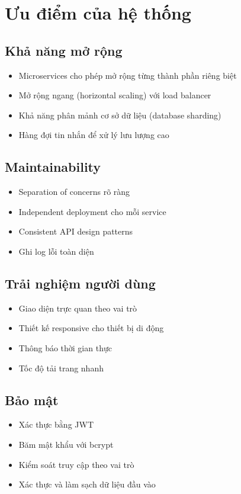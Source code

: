 \documentclass[12pt,a4paper]{report}
\begin{document}
    \section{Ưu điểm của hệ thống}

    \subsection{Khả năng mở rộng}
    \begin{itemize}
        \item Microservices cho phép mở rộng từng thành phần riêng biệt
        \item Mở rộng ngang (horizontal scaling) với load balancer
        \item Khả năng phân mảnh cơ sở dữ liệu (database sharding)
        \item Hàng đợi tin nhắn để xử lý lưu lượng cao
    \end{itemize}

    \subsection{Maintainability}
    \begin{itemize}
        \item Separation of concerns rõ ràng
        \item Independent deployment cho mỗi service
        \item Consistent API design patterns
    \item Ghi log lỗi toàn diện
    \end{itemize}

    \subsection{Trải nghiệm người dùng}
    \begin{itemize}
    \item Giao diện trực quan theo vai trò
    \item Thiết kế responsive cho thiết bị di động
    \item Thông báo thời gian thực
    \item Tốc độ tải trang nhanh
    \end{itemize}

    \subsection{Bảo mật}
    \begin{itemize}
    \item Xác thực bằng JWT
    \item Băm mật khẩu với bcrypt
    \item Kiểm soát truy cập theo vai trò
    \item Xác thực và làm sạch dữ liệu đầu vào
    \end{itemize}
\end{document}
